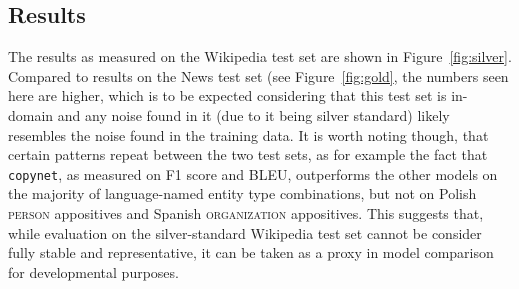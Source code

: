 \documentclass[11pt]{article}
\begin{document}
\subsection{Results}
The results as measured on the Wikipedia test set are shown in Figure~\ref{fig:silver}. Compared to results on the News test set (see Figure~\ref{fig:gold}, the numbers seen here are higher, which is to be expected considering that this test set is in-domain and any noise found in it (due to it being silver standard) likely resembles the noise found in the training data. It is worth noting though, that certain patterns repeat between the two test sets, as for example the fact that \texttt{copynet}, as measured on F1 score and BLEU, outperforms the other models on the majority of language-named entity type combinations, but not on Polish \textsc{person} appositives and Spanish \textsc{organization} appositives. This suggests that, while evaluation on the silver-standard Wikipedia test set cannot be consider fully stable and representative, it can be taken as a proxy in model comparison for developmental purposes.
\end{document}
